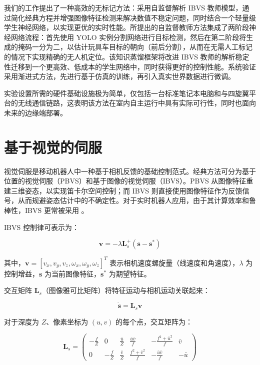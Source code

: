 \documentclass[10pt,twocolumn,letterpaper]{article}
\begin{document}
我们的工作提出了一种高效的无标记方法：采用自监督解析 IBVS 教师模型，通过简化经典方程并增强图像特征检测来解决数值不稳定问题，同时结合一个轻量级学生神经网络，以实现更优的实时性能。所提出的自监督教师方法集成了两阶段神经网络流程：首先使用 YOLO \cite{redmon2016you, riftiarrasyid2024suitability, yang2025comparative} 实例分割网络进行目标检测，然后在第二阶段将生成的掩码一分为二，以估计玩具车目标的朝向（前后分割），从而在无需人工标记的情况下实现精确的无人机定位。该知识蒸馏框架将改进 IBVS 教师的解析稳定性迁移到一个更高效、低成本的学生网络中，同时获得更好的控制性能。系统验证采用渐进式方法，先进行基于仿真的训练，再引入真实世界数据进行微调。

实验设置所需的硬件基础设施极为简单，仅包括一台标准笔记本电脑和与四旋翼平台的无线通信链路，这表明该方法在室内自主运行中具有实际可行性，同时也面向未来的边缘端部署。

\section{基于视觉的伺服}
\label{sec:related_work}
视觉伺服是移动机器人中一种基于相机反馈的基础控制范式。经典方法可分为基于位置的视觉伺服（PBVS）和基于图像的视觉伺服（IBVS）。PBVS 从图像特征重建三维姿态，以实现笛卡尔空间控制\cite{qin2023perception, sun2025towards}；而 IBVS 则直接使用图像特征作为反馈信号，从而规避姿态估计中的不确定性\cite{corke1996visual, yang2020autonomous, lee2012adaptive}。对于实时机器人应用，由于其计算效率和鲁棒性，IBVS 更常被采用 \cite{yang2024high, kumar2024tracking}。

IBVS 控制律可表示为：

\begin{equation}
\mathbf{v} = -\lambda \mathbf{L}_s^+ (\mathbf{s} - \mathbf{s}^*)
\end{equation}

其中，$\mathbf{v} = [v_x, v_y, v_z, \omega_x, \omega_y, \omega_z]^T$ 表示相机速度螺旋量（线速度和角速度），$\lambda$ 为控制增益，$\mathbf{s}$ 为当前图像特征，$\mathbf{s}^*$ 为期望特征。

交互矩阵 $\mathbf{L}_s$（图像雅可比矩阵）将特征运动与相机运动关联起来：

\begin{equation}
\dot{\mathbf{s}} = \mathbf{L}_s \mathbf{v}
\end{equation}

对于深度为 $Z$、像素坐标为 $(u, v)$ 的每个点，交互矩阵为：

\begin{equation}
\label{eq:ibvs-full}
\mathbf{L}_s = \begin{pmatrix}
-\frac{f}{Z} & 0 & \frac{\bar{u}}{Z} & \frac{\bar{u} \bar{v}}{f} & -\frac{f^2 + \bar{u}^2}{f} & \bar{v} \\
0 & -\frac{f}{Z} & \frac{\bar{v}}{Z} & \frac{f^2 + \bar{v}^2}{f} & -\frac{\bar{u} \bar{v}}{f} & -\bar{u}
\end{pmatrix}
\end{equation}
\end{document}
